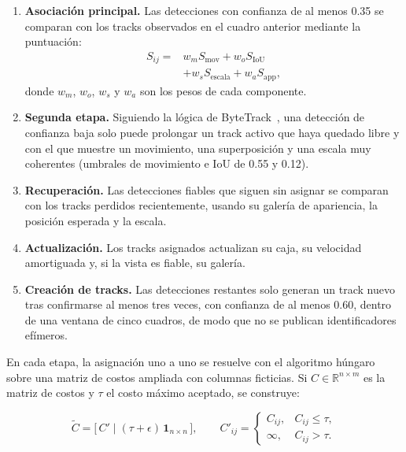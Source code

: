 \documentclass[12pt,a4paper]{article}
\begin{document}
\begin{enumerate}
    \item \textbf{Asociación principal.} Las detecciones con confianza de
    al menos 0.35 se comparan con los tracks observados en el cuadro
    anterior mediante la puntuación:
    \begin{equation}
    \begin{aligned}
    S_{ij} ={}&
    w_mS_{\text{mov}}
    +w_oS_{\text{IoU}} \\
    &+w_sS_{\text{escala}}
    +w_aS_{\text{app}},
    \end{aligned}
    \end{equation}
    donde $w_m$, $w_o$, $w_s$ y $w_a$ son los pesos de cada componente.

    \item \textbf{Segunda etapa.} Siguiendo la lógica de ByteTrack~\cite{zhang2022bytetrack}, una
    detección de confianza baja solo puede prolongar un track activo que
    haya quedado libre y con el que muestre un movimiento, una
    superposición y una escala muy coherentes (umbrales de movimiento e
    IoU de 0.55 y 0.12).

    \item \textbf{Recuperación.} Las detecciones fiables que siguen sin
    asignar se comparan con los tracks perdidos recientemente, usando su
    galería de apariencia, la posición esperada y la escala.

    \item \textbf{Actualización.} Los tracks asignados actualizan su
    caja, su velocidad amortiguada y, si la vista es fiable, su galería.

    \item \textbf{Creación de tracks.} Las detecciones restantes solo
    generan un track nuevo tras confirmarse al menos tres veces, con
    confianza de al menos 0.60, dentro de una ventana de cinco cuadros,
    de modo que no se publican identificadores efímeros.
\end{enumerate}

En cada etapa, la asignación uno a uno se resuelve con el algoritmo
húngaro~\cite{kuhn1955} sobre una matriz de costos ampliada con columnas ficticias. Si
$C\in\mathbb{R}^{n\times m}$ es la matriz de costos y $\tau$ el costo
máximo aceptado, se construye:

\begin{equation}
\tilde{C}=
\big[\,C' \;\big|\; (\tau+\epsilon)\,\mathbf{1}_{n\times n}\,\big],
\qquad
C'_{ij}=
\begin{cases}
C_{ij}, & C_{ij}\le\tau,\\
\infty, & C_{ij}>\tau.
\end{cases}
\end{equation}
\end{document}
